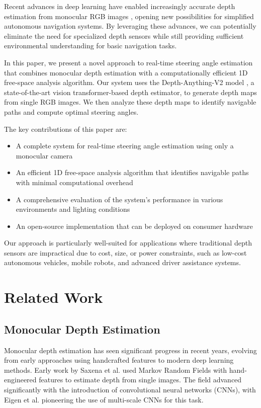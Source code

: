 \documentclass[conference]{IEEEtran}
\begin{document}
Recent advances in deep learning have enabled increasingly accurate depth estimation from monocular RGB images \cite{b2}, opening new possibilities for simplified autonomous navigation systems. By leveraging these advances, we can potentially eliminate the need for specialized depth sensors while still providing sufficient environmental understanding for basic navigation tasks.

In this paper, we present a novel approach to real-time steering angle estimation that combines monocular depth estimation with a computationally efficient 1D free-space analysis algorithm. Our system uses the Depth-Anything-V2 model \cite{b3}, a state-of-the-art vision transformer-based depth estimator, to generate depth maps from single RGB images. We then analyze these depth maps to identify navigable paths and compute optimal steering angles.

The key contributions of this paper are:
\begin{itemize}
\item A complete system for real-time steering angle estimation using only a monocular camera
\item An efficient 1D free-space analysis algorithm that identifies navigable paths with minimal computational overhead
\item A comprehensive evaluation of the system's performance in various environments and lighting conditions
\item An open-source implementation that can be deployed on consumer hardware
\end{itemize}

Our approach is particularly well-suited for applications where traditional depth sensors are impractical due to cost, size, or power constraints, such as low-cost autonomous vehicles, mobile robots, and advanced driver assistance systems.

\section{Related Work}

\subsection{Monocular Depth Estimation}
Monocular depth estimation has seen significant progress in recent years, evolving from early approaches using handcrafted features to modern deep learning methods. Early work by Saxena et al. \cite{b4} used Markov Random Fields with hand-engineered features to estimate depth from single images. The field advanced significantly with the introduction of convolutional neural networks (CNNs), with Eigen et al. \cite{b5} pioneering the use of multi-scale CNNs for this task.
\end{document}

